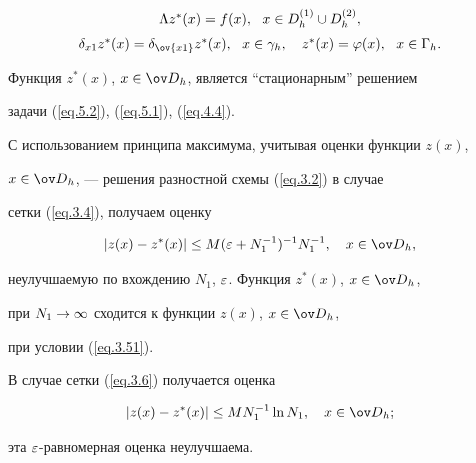 \begin{equation} \label{eq.5.3}


\begin{array}{c}


\La z^*(x) = f(x), \ \ x\in D^{(1)}_h \cup D^{(2)}_h,\\[2mm]


\de_{x1} z^*(x) = \de_{\ov{x1}}z^*(x), \ \ x\in \gamma_h, \quad


z^*(x) = \vp(x), \ \ x\in \G_h. 


\end{array}


\end{equation}


Функция $z^*(x)$, $x\in\od_h$, является ``стационарным'' решением 


задачи (\ref{eq.5.2}), (\ref{eq.5.1}), (\ref{eq.4.4}).





С использованием принципа максимума, учитывая оценки функции $z(x)$,


$x\in \od_h$, --- решения разностной схемы (\ref{eq.3.2}) в случае


сетки (\ref{eq.3.4}), получаем оценку


\begin{equation} \label{eq.5.4}


|z(x)-z^*(x)|\le M (\eps+N^{-1}_1)^{-1} N_1^{-1}, \quad x\in \od_h,


\end{equation}


неулучшаемую по вхождению $N_1$, $\varepsilon$. Функция $z^*(x)$, $x\in\od_h$,


при $N_1\rightarrow\infty$ сходится к функции $z(x)$, $x\in\od_h$,


при условии (\ref{eq.3.51}).





В случае сетки (\ref{eq.3.6}) получается оценка


\begin{equation} \label{eq.5.5}


|z(x)-z^*(x)|\le M N^{-1}_1 \ln N_1, \quad x\in \od_h;


\end{equation}


эта $\varepsilon$-равномерная оценка неулучшаема.








